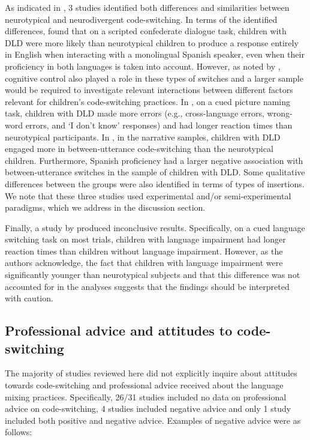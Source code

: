 \documentclass[output=paper]{langscibook}
\begin{document}
As indicated in , 3 studies identified both differences and similarities between neurotypical and neurodivergent code-switching. In terms of the identified differences, \citet{GrossKaushanskaya2022} found that on a scripted confederate dialogue task, children with DLD were more likely than neurotypical children to produce a response entirely in English when interacting with a monolingual Spanish speaker, even when their proficiency in both languages is taken into account. However, as noted by \citet{GrossKaushanskaya2022}, cognitive control also played a role in these types of switches and a larger sample would be required to investigate relevant interactions between different factors relevant for children’s code-switching practices. In \citet{SnijdersEtAl2025}, on a cued picture naming task, children with DLD made more errors (e.g., cross-language errors, wrong-word errors, and ‘I don’t know’ responses) and had longer reaction times than neurotypical participants. In \citet{GrossCastilla-Earls2023}, in the narrative samples, children with DLD engaged more in between-utterance code-switching than the neurotypical children. Furthermore, Spanish proficiency had a larger negative association with between-utterance switches in the sample of children with DLD. Some qualitative differences between the groups were also identified in terms of types of insertions. We note that these three studies used experimental and/or semi-experimental paradigms, which we address in the discussion section.

Finally, a study by \citet{KingEtAl2021} produced inconclusive results. Specifically, on a cued language switching task on most trials, children with language impairment had longer reaction times than children without language impairment. However, as the authors acknowledge, the fact that children with language impairment were significantly younger than neurotypical subjects and that this difference was not accounted for in the analyses suggests that the findings should be interpreted with caution.

\subsection{Professional advice and attitudes to code-switching}

The majority of studies reviewed here did not explicitly inquire about attitudes towards code-switching and professional advice received about the language mixing practices. Specifically, 26/31 studies included no data on professional advice on code-switching, 4 studies included negative advice and only 1 study included both positive and negative advice. Examples of negative advice were as follows:
\end{document}
